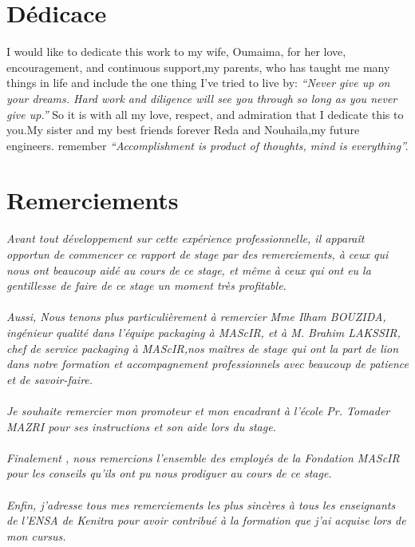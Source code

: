 \documentclass[11pt, a4paper, twoside]{book}
\author{Réalisé par : \\ Otmane BOUAYAD \vspace*{1truecm} \\ Encadré par : \\ Mme Ilham BOUZIDA : Encadrante professionnelle\\ }
\date{(Du 15 Février au 25 Août  2016)}
\begin{document}
\maketitle
\pagestyle{plain}

\chapter*{Dédicace}

I would like to dedicate this work to my wife, Oumaima, for her love, encouragement, and continuous support,my parents, who has taught me many things in life and include the one thing I’ve tried to live by: 
\emph{“Never give up on your dreams. Hard work and diligence will see you through so long as you never give up.”}
 So it is with all my love, respect, and admiration that I dedicate this to you.My sister and my best friends forever Reda and Nouhaila,my future engineers. remember
\emph{“Accomplishment is product of thoughts, mind is everything”.}

\chapter*{Remerciements}
\emph{
Avant tout développement sur cette expérience professionnelle, il apparaît opportun 
de commencer ce rapport de stage par des remerciements, à ceux qui nous ont beaucoup 
aidé au cours de ce stage, et même à ceux qui ont eu la gentillesse de faire de ce stage un 
moment très profitable.\\\\}
\emph{
Aussi, Nous tenons plus particulièrement à remercier Mme Ilham
BOUZIDA, ingénieur qualité dans l’équipe packaging à MAScIR, et à M. Brahim LAKSSIR, chef de service packaging à MAScIR,nos maîtres de stage qui ont la part de lion dans notre formation et accompagnement professionnels avec beaucoup de patience et de savoir-faire.\\\\ }
\emph{Je souhaite remercier mon promoteur et mon encadrant à l'école Pr. Tomader MAZRI pour ses instructions et son aide lors du stage.\\\\}
\emph{
Finalement , nous remercions l’ensemble des employés de la Fondation MAScIR pour les conseils qu’ils ont pu nous prodiguer au cours de ce stage.
}\\\\
\emph{Enfin, j’adresse tous mes remerciements les plus sincères à tous les enseignants de l’ENSA de Kenitra pour avoir contribué à la formation que j’ai acquise lors de mon cursus.}
\tableofcontents
\end{document}

